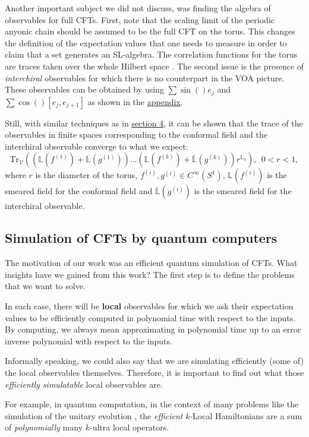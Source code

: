 \documentclass[twoside,11pt,titlepage]{amsart}
\renewcommand{\=}[1]{\stackrel{#1}{=}} %
\theoremstyle{definition}
\theoremstyle{remark}
\begin{document}
Another important subject we did not discuss, was finding the algebra of observables for full CFTs. First, note that the scaling limit of the periodic anyonic chain should be assumed to be the full CFT on the torus. This changes the definition of the expectation values that one needs to measure in order to claim that a set generates an SL-algebra. The correlation functions for the torus are traces taken over the whole Hilbert space \cite{konig2017matrix}. The second issue is the presence of \textit{interchiral} observables \cite[section 6]{gainutdinov2016associative} for which there is no counterpart in the VOA picture. These observables can be obtained by using $\sum \sin()e_j$ and $\sum \cos()[e_j,e_{j+1}]$ as shown in the \hyperref[A.2]{appendix}. 

Still, with similar techniques as in \hyperref[4]{section 4}, it can be shown that the trace of the observables in finite spaces corresponding to the conformal field and the interchiral observable converge to what we expect:
$$\text{Tr}_\mathcal{V}((\mathbb{L}(f^{(1)})+\overline{\mathbb{L}}(g^{(1)}))\ldots (\mathbb{L}(f^{(k)})+\overline{\mathbb{L}}(g^{(k)}))r^{\mathbb{L}_0}), \ \ 0<r<1,$$
where $r$ is the diameter of the torus, $f^{(i)},g^{(i)} \in C^\infty(S^1)$, $\mathbb{L}(f^{(i)})$ is the smeared field for the conformal field and $\overline{\mathbb{L}}(g^{(i)})$ is the smeared field for the interchiral observable.

\subsection{Simulation of CFTs by quantum computers}\label{5.3}

\hfill \break 
The motivation of our work was an efficient quantum simulation of CFTs. What insights have we gained from this work? The first step is to define the problems that we want to solve. 

In each case, there will be \textbf{local} observables for which we ask their expectation values to be efficiently computed in polynomial time with respect to the inputs. By computing, we always mean approximating in polynomial time up to an error inverse polynomial with respect to the inputs. 

Informally speaking, we could also say that we are simulating efficiently (some of) the local observables themselves. Therefore, it is important to find out what those \textit{efficiently simulatable} local observables are. 

For example, in quantum computation, in the context of many problems like the simulation of the unitary evolution \cite{lloyd1996universal}, the \textit{efficient} $k$-Local Hamiltonians are a sum of \textit{polynomially} many $k$-ultra local operators.
\end{document}
